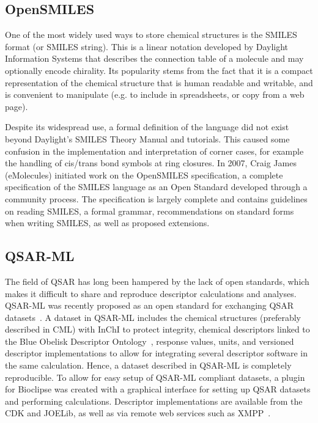 \documentclass[10pt]{bmc_article}
\newenvironment{bmcformat}{\fussy\setboolean{publ}{true}}{\fussy}
\begin{document}
\begin{bmcformat}
    \subsection*{OpenSMILES}

One of the most widely used ways to store chemical structures is the
SMILES format (or SMILES string). This is a linear notation developed
by Daylight Information Systems that describes the connection table
of a molecule and may optionally encode chirality. Its popularity
stems from the fact that it is a compact representation of the
chemical structure that is human readable and writable, and is
convenient to manipulate (e.g. to include in spreadsheets, or copy
from a web page).

Despite its widespread use, a formal
definition of the language did not exist beyond Daylight's SMILES
Theory Manual and tutorials. This caused some confusion in the
implementation and interpretation of corner cases, for example the
handling of cis/trans bond symbols at ring closures. In 2007, Craig
James (eMolecules) initiated work on the OpenSMILES specification, a
complete specification of the SMILES language as an Open Standard
developed through a community process. The specification is largely
complete and contains guidelines on reading SMILES, a formal
grammar, recommendations on standard forms when writing SMILES, as
well as proposed extensions.

\subsection*{QSAR-ML}
The field of QSAR has long been hampered by the lack of open
standards, which makes it difficult to share and reproduce descriptor
calculations and analyses. QSAR-ML was recently proposed as an open
standard for exchanging QSAR datasets~\cite{Spjuth:2010uq}. A dataset
in QSAR-ML includes the chemical structures (preferably described in
CML) with InChI to protect integrity, chemical descriptors linked to
the Blue Obelisk Descriptor Ontology~\cite{bodo}, response values,
units, and versioned descriptor implementations to allow for
integrating several descriptor software in the same calculation.
Hence, a dataset described in QSAR-ML is completely reproducible. To
allow for easy setup of QSAR-ML compliant datasets, a plugin for
Bioclipse was created with a graphical interface for
setting up QSAR datasets and performing calculations. Descriptor
implementations are available from the CDK and JOELib, as well
as via remote web services such as XMPP~\cite{Wagener:2009uq}.


\end{bmcformat}
\end{document}
